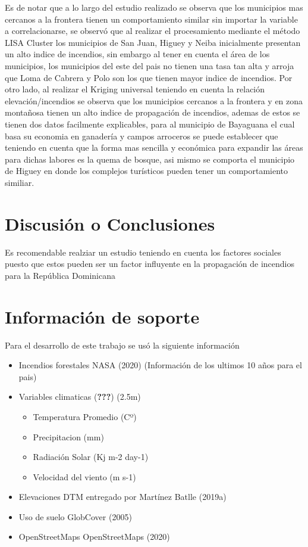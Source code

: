 \documentclass[11pt,]{article}
\providecommand{\tightlist}{%
\setlength{\itemsep}{0pt}\setlength{\parskip}{0pt}}
\begin{document}
Es de notar que a lo largo del estudio realizado se observa que los
municipios mas cercanos a la frontera tienen un comportamiento similar
sin importar la variable a correlacionarse, se observó que al realizar
el procesamiento mediante el método LISA Cluster los municipios de San
Juan, Higuey y Neiba inicialmente presentan un alto indice de incendios,
sin embargo al tener en cuenta el área de los municipios, los municipios
del este del pais no tienen una tasa tan alta y arroja que Loma de
Cabrera y Polo son los que tienen mayor indice de incendios. Por otro
lado, al realizar el Kriging universal teniendo en cuenta la relación
elevación/incendios se observa que los municipios cercanos a la frontera
y en zona montañosa tienen un alto indice de propagación de incendios,
ademas de estos se tienen dos datos facilmente explicables, para al
municipio de Bayaguana el cual basa su economia en ganadería y campos
arroceros se puede establecer que teniendo en cuenta que la forma mas
sencilla y económica para expandir las áreas para dichas labores es la
quema de bosque, asi mismo se comporta el municipio de Higuey en donde
los complejos turísticos pueden tener un comportamiento similiar.

\section{Discusión o Conclusiones}\label{discusiuxf3n-o-conclusiones}

Es recomendable realziar un estudio teniendo en cuenta los factores
sociales puesto que estos pueden ser un factor influyente en la
propagación de incendios para la República Dominicana

\section{Información de soporte}\label{informaciuxf3n-de-soporte}

Para el desarrollo de este trabajo se usó la siguiente información

\begin{itemize}
\tightlist
\item
  Incendios forestales NASA (2020) (Información de los ultimos 10 años
  para el pais)
\item
  Variables climaticas ({\textbf{???}}) (2.5m)

  \begin{itemize}
  \tightlist
  \item
    Temperatura Promedio (Cº)
  \item
    Precipitacion (mm)
  \item
    Radiación Solar (Kj m-2 day-1)
  \item
    Velocidad del viento (m s-1)
  \end{itemize}
\item
  Elevaciones DTM entregado por Martínez Batlle (2019a)
\item
  Uso de suelo GlobCover (2005)
\item
  OpenStreetMaps OpenStreetMaps (2020)
\end{itemize}
\end{document}
